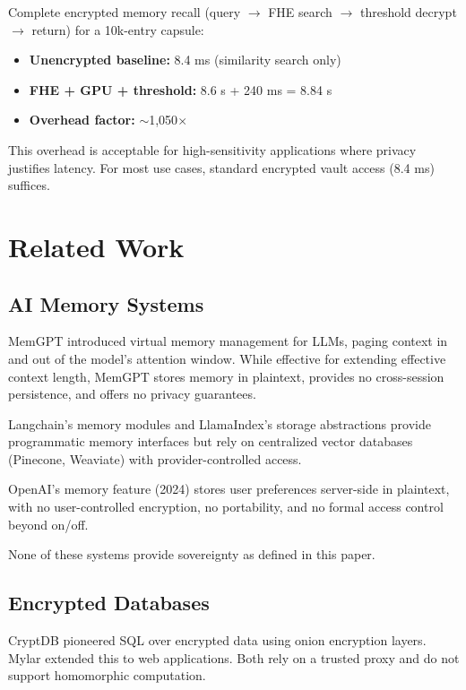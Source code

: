 \documentclass[11pt,letterpaper]{article}
\theoremstyle{definition}
\theoremstyle{remark}
\begin{document}
Complete encrypted memory recall (query $\to$ FHE search $\to$ threshold decrypt $\to$ return) for a 10k-entry capsule:

\begin{itemize}
    \item \textbf{Unencrypted baseline:} 8.4 ms (similarity search only)
    \item \textbf{FHE + GPU + threshold:} 8.6 s + 240 ms = 8.84 s
    \item \textbf{Overhead factor:} $\sim$1,050$\times$
\end{itemize}

This overhead is acceptable for high-sensitivity applications where privacy justifies latency. For most use cases, standard encrypted vault access (8.4 ms) suffices.

\section{Related Work}
\label{sec:related}

\subsection{AI Memory Systems}

MemGPT \cite{packer2023memgpt} introduced virtual memory management for LLMs, paging context in and out of the model's attention window. While effective for extending effective context length, MemGPT stores memory in plaintext, provides no cross-session persistence, and offers no privacy guarantees.

Langchain's memory modules and LlamaIndex's storage abstractions provide programmatic memory interfaces but rely on centralized vector databases (Pinecone, Weaviate) with provider-controlled access.

OpenAI's memory feature (2024) stores user preferences server-side in plaintext, with no user-controlled encryption, no portability, and no formal access control beyond on/off.

None of these systems provide sovereignty as defined in this paper.

\subsection{Encrypted Databases}

CryptDB \cite{popa2011cryptdb} pioneered SQL over encrypted data using onion encryption layers. Mylar \cite{popa2014mylar} extended this to web applications. Both rely on a trusted proxy and do not support homomorphic computation.
\end{document}
